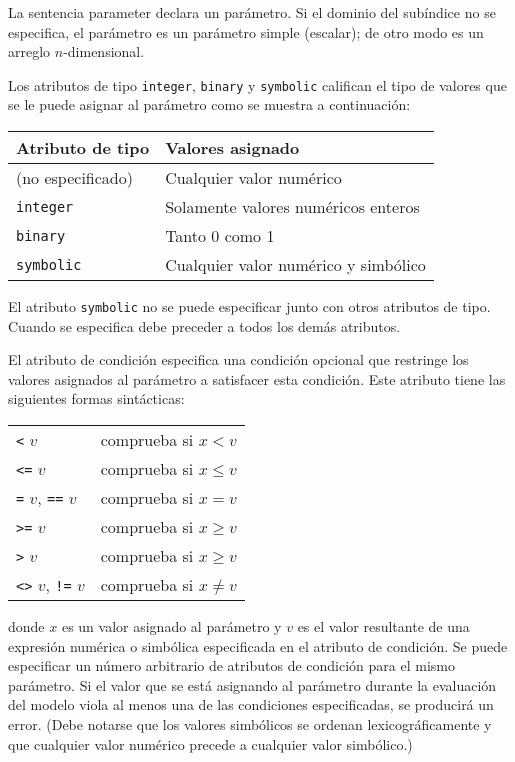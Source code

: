 \documentclass[11pt,spanish]{report}
\begin{document}
La sentencia parameter declara un parámetro. Si el dominio del subíndice no se especifica, el parámetro es un parámetro simple (escalar); de otro modo es un arreglo $n$-dimensional.

Los atributos de tipo {\tt integer}, {\tt binary} y {\tt symbolic} califican el tipo de valores que se le puede asignar al parámetro como se muestra a continuación:

\noindent\hfil
\begin{tabular}{@{}ll@{}}
Atributo de tipo&Valores asignado\\
\hline
(no especificado)&Cualquier valor numérico\\
{\tt integer}&Solamente valores numéricos enteros\\
{\tt binary}&Tanto 0 como 1\\
{\tt symbolic}&Cualquier valor numérico y simbólico\\
\end{tabular}

El atributo {\tt symbolic} no se puede especificar junto con otros atributos de tipo. Cuando se especifica debe preceder a todos los demás atributos.

El atributo de condición especifica una condición opcional que restringe los valores asignados al parámetro a satisfacer esta condición. Este atributo tiene las siguientes formas sintácticas:

\begin{tabular}{@{}ll@{}}
{\tt<} $v$&comprueba si $x<v$\\
{\tt<=} $v$&comprueba si $x\leq v$\\
{\tt=} $v$, {\tt==} $v$&comprueba si $x=v$\\
{\tt>=} $v$&comprueba si $x\geq v$\\
{\tt>} $v$&comprueba si $x\geq v$\\
{\tt<>} $v$, {\tt!=} $v$&comprueba si $x\neq v$\\
\end{tabular}

\noindent donde $x$ es un valor asignado al parámetro y $v$ es el valor resultante de una expresión numérica o simbólica especificada en el atributo de condición. Se puede especificar un número arbitrario de atributos de condición para el mismo parámetro. Si el valor que se está asignando al parámetro durante la evaluación del modelo viola al menos una de las condiciones especificadas, se producirá un error. (Debe notarse que los valores simbólicos se ordenan lexicográficamente y que cualquier valor numérico precede a cualquier valor simbólico.)
\end{document}
